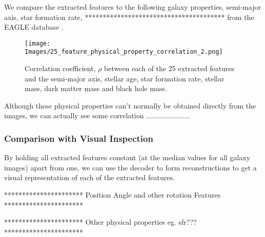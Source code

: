\documentclass[12pt, onecolumn]{article}
\begin{document}
        We compare the extracted features to the following galaxy properties, semi-major axis, star formation rate, *************************************** from the EAGLE database \cite{eagle_catalogue_public_release}.

        \begin{figure}[H]
            \centering
            \texttt{[image: Images/25\_feature\_physical\_property\_correlation\_2.png]}
            \caption{Correlation coefficient, $\rho$ between each of the 25 extracted features and the semi-major axis, stellar age, star formation rate, stellar mass, dark matter mass and black hole mass.}
            \label{physical_correlation}
        \end{figure}

        Although these physical properties can't normally be obtained directly from the images, we can actually see some correlation ......................

        



        \subsubsection{Comparison with Visual Inspection}
        \label{visual_inspection}

        By holding all extracted features constant (at the median values for all galaxy images) apart from one, we can use the decoder to form reconstructions to get a visual representation of each of the extracted features.


        \vspace{5mm}

        **********************
        Position Angle and other rotation Features
        **********************

        \vspace{5mm}

        \vspace{5mm}

        **********************
        Other physical properties eg. sfr???
        **********************
\end{document}
